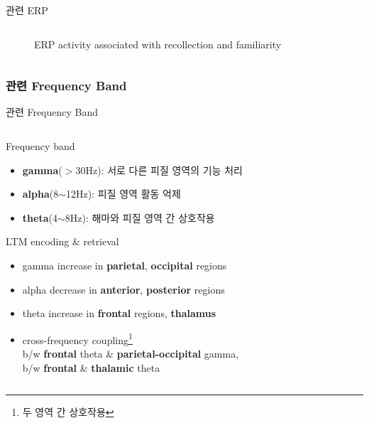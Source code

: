\documentclass{beamer}
\begin{document}
\begin{frame}{관련 ERP}
\begin{columns}
\begin{column}{0.48\textwidth}
\begin{figure}
        \caption{ERP activity associated with recollection and familiarity}
      \end{figure}
    \end{column}
  \end{columns}
\end{frame}

\subsubsection{관련 Frequency Band}
\begin{frame}{관련 Frequency Band}
  \begin{columns}
    \begin{column}{0.58\textwidth}
      \begin{block}{Frequency band}
        \begin{itemize}
          \item \textbf{gamma}($>$30Hz): 서로 다른 피질 영역의 기능 처리 
          \item \textbf{alpha}(8$\sim$12Hz): 피질 영역 활동 억제
          \item \textbf{theta}(4$\sim$8Hz): 해마와 피질 영역 간 상호작용
        \end{itemize}
      \end{block}
      \begin{block}{LTM encoding \& retrieval}
        \begin{itemize}
          \item gamma increase in \textbf{parietal}, \textbf{occipital} regions
          \item alpha decrease in \textbf{anterior}, \textbf{posterior} regions
          \item theta increase in \textbf{frontal} regions, \textbf{thalamus}
          \item cross-frequency coupling\footnote{두 영역 간 상호작용} \\b/w \textbf{frontal} theta \& \textbf{parietal-occipital} gamma,\\b/w \textbf{frontal} \& \textbf{thalamic} theta
        \end{itemize}
      \end{block}
    \end{column}
    \hfill
    \begin{column}{0.38\textwidth}
      \begin{figure}
        \centering

\end{figure}
\end{column}
\end{columns}
\end{frame}
\end{document}
